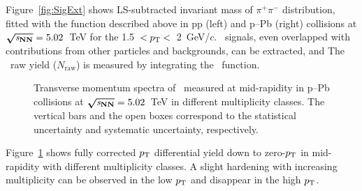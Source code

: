 \documentclass[ALICE,manyauthors]{cernphprep}
\begin{document}
Figure~\ref{fig:SigExt} shows LS-subtracted invariant mass of $\pi^{+}\pi^{-}$ distribution, fitted with the function described above in pp (left) and p--Pb (right) collisions at $\boldsymbol{\sqrt{{\textit s_\mathrm{NN}}}}=5.02$~TeV for the 1.5~$<p_{\rm{T}}<$~2~GeV/$c$. \fzero~signals, even overlapped with contributions from other particles and backgrounds, can be extracted, and The \fzero~raw yield ($N_{\mathrm{raw}}$) is measured by integrating the \fzero~function.

\begin{figure}[!hbt]
	\centering
	\caption{ Transverse momentum spectra of \fzero~measured at mid-rapidity in p--Pb collisions at $\boldsymbol{\sqrt{{\textit s_\mathrm{NN}}}}=5.02$~TeV in different multiplicity classes. The vertical bars and the open boxes correspond to the statistical uncertainty and systematic uncertainty, respectively. }
	\label{fig:pt}
\end{figure}

Figure~\ref{fig:pt} shows fully corrected $p_{\rm{T}}$ differential yield down to zero-$p_{\rm{T}}$ in mid-rapidity with different multiplicity classes. A slight hardening with increasing multiplicity can be observed in the low $p_{\rm{T}}$ and disappear in the high $p_{\rm{T}}$. 
\end{document}
